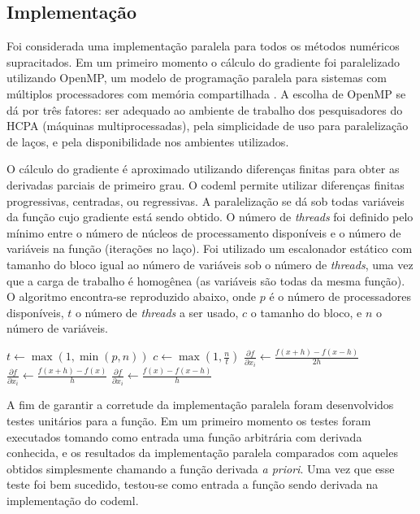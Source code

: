 \documentclass[cic,tc]{iiufrgs}
\begin{document}
{\subsection{Implementação}
\label{subsec:codemlpar}

Foi considerada uma implementação paralela para todos os métodos numéricos
supracitados. Em um primeiro momento o cálculo do gradiente foi paralelizado
utilizando OpenMP, um modelo de programação paralela para sistemas com
múltiplos processadores com memória compartilhada \cite{chandra2001parallel}. A
escolha de OpenMP se dá por três fatores: ser adequado ao ambiente de trabalho
dos pesquisadores do HCPA (máquinas multiprocessadas), pela simplicidade de uso
para paralelização de laços, e pela disponibilidade nos ambientes utilizados.

O cálculo do gradiente é aproximado utilizando diferenças finitas para obter as
derivadas parciais de primeiro grau. O codeml permite utilizar diferenças
finitas progressivas, centradas, ou regressivas. A paralelização se dá sob
todas variáveis da função cujo gradiente está sendo obtido. O número de \textit{threads}
foi definido pelo mínimo entre o número de núcleos de processamento disponíveis
e o número de variáveis na função (iterações no laço). Foi utilizado um
escalonador estático com tamanho do bloco igual ao número de variáveis sob o
número de \textit{threads}, uma vez que a carga de trabalho é homogênea (as variáveis
são todas da mesma função). O algoritmo encontra-se reproduzido abaixo, onde
$p$ é o número de processadores disponíveis, $t$ o número de \textit{threads} a ser
usado, $c$ o tamanho do bloco, e $n$ o número de variáveis.

\begin{algorithmic}
\State $t \gets \max(1, \min(p, n))$
\State $c \gets \max(1, \frac{n}{t})$
    \State $\frac{\partial f}{\partial x_i} \gets \frac{f(x+h)-f(x-h)}{2h}$
    \State $\frac{\partial f}{\partial x_i} \gets \frac{f(x+h)-f(x)}{h}$
  \Else
    \State $\frac{\partial f}{\partial x_i} \gets \frac{f(x)-f(x-h)}{h}$
  \EndIf
\EndFor
\end{algorithmic}

A fim de garantir a corretude da implementação paralela foram desenvolvidos
testes unitários para a função. Em um primeiro momento os testes foram
executados tomando como entrada uma função arbitrária com derivada conhecida,
e os resultados da implementação paralela comparados com aqueles obtidos
simplesmente chamando a função derivada \textit{a priori}. Uma vez que esse
teste foi bem sucedido, testou-se como entrada a função sendo derivada na
implementação do codeml.

}
\end{document}

